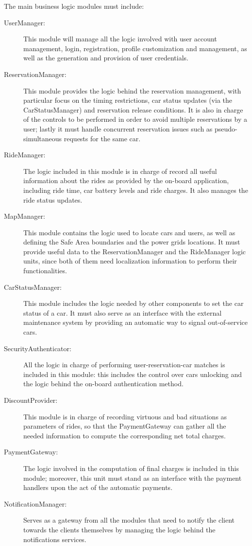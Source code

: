 The main business logic modules must include:

\begin{description}
\item[UserManager:] This module will manage all the logic involved with user account management, login, registration, profile customization and management, as well as the generation and provision of user credentials.
\item[ReservationManager:] This module provides the logic behind the reservation management, with particular focus on the timing restrictions, car status updates (via the CarStatusManager) and reservation release conditions. It is also in charge of the controls to be performed in order to avoid multiple reservations by a user; lastly it must handle concurrent reservation issues such as pseudo-simultaneous requests for the same car.
\item[RideManager:] The logic included in this module is in charge of record all useful information about the rides as provided by the on-board application, including ride time, car battery levels and ride charges. It also manages the ride status updates.
\item[MapManager:] This module contains the logic used to locate cars and users, as well as defining the Safe Area boundaries and the power grids locations. It must provide useful data to the ReservationManager and the RideManager logic units, since both of them need localization information to perform their functionalities.
\item[CarStatusManager:] This module includes the logic needed by other components to set the car status of a car. It must also serve as an interface with the external maintenance system by providing an automatic way to signal out-of-service cars.
\item[SecurityAuthenticator:] All the logic in charge of performing user-reservation-car matches is included in this module: this includes the control over cars unlocking and the logic behind the on-board authentication method.
\item[DiscountProvider:] This module is in charge of recording virtuous and bad situations as parameters of rides, so that the PaymentGateway can gather all the needed information to compute the corresponding net total charges.
\item[PaymentGateway:] The logic involved in the computation of final charges is included in this module; moreover, this unit must stand as an interface with the payment handlers upon the act of the automatic payments.
\item[NotificationManager:] Serves as a gateway from all the modules that need to notify the client towards the clients themselves by managing the logic behind the notifications services.
\end{description}

